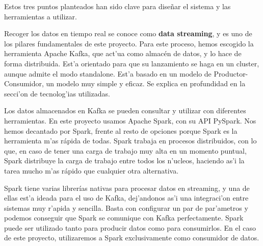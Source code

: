 Estos tres puntos planteados han sido clave para diseñar el sistema y las herramientas a utilizar.

Recoger los datos en tiempo real se conoce como \textbf{data streaming}, y es uno de los pilares fundamentales de este proyecto. Para este proceso, hemos escogido la herramienta Apache Kafka, que act'ua como almacén de datos, y lo hace de forma distribuida. Est'a orientado para que su lanzamiento se haga en un cluster, aunque admite el modo standalone. Est'a basado en un modelo de Productor-Consumidor, un modelo muy simple y eficaz. Se explica en profundidad en la secci'on de tecnolog'ias utilizadas.

Los datos almacenados en Kafka se pueden consultar y utilizar con diferentes herramientas. En este proyecto usamos Apache Spark, con su API PySpark. Nos hemos decantado por Spark, frente al resto de opciones porque Spark es la herramienta m'as rápida de todas. Spark trabaja en procesos distribuidos, con lo que, en caso de tener una carga de trabajo muy alta en un momento puntual, Spark distribuye la carga de trabajo entre todos los n'ucleos, haciendo as'i la tarea mucho m'as rápido que cualquier otra alternativa.

Spark tiene varias librerías nativas para procesar datos en streaming, y una de ellas est'a ideada para el uso de Kafka, dej'andonos as'i una integraci'on entre sistemas muy r'apida y sencilla. Basta con configurar un par de par'ametros y podemos conseguir que Spark se comunique con Kafka perfectamente. Spark puede ser utilizado tanto para producir datos como para consumirlos. En el caso de este proyecto, utilizaremos a Spark exclusivamente como consumidor de datos. 

\clearpage


